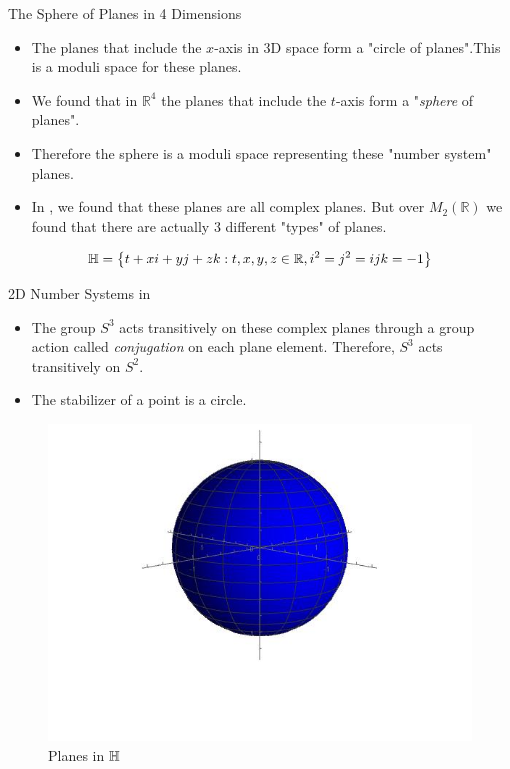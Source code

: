 \documentclass[t,slidestop,compress,mathserif,color=option,hyperref={pdfstartview={Fit},pdfpagelayout={SinglePage},pdfpagemode={UseOutlines}}]{beamer}
\begin{document}
\begin{frame}{The Sphere of Planes in 4 Dimensions}
    \begin{itemize}
        \item The planes that include the $x$-axis in 3D space form a "circle of planes".This is a moduli space for these planes.
        \item We found that in $\mathbb{R}^4$ the planes that include the $t$-axis form a "\textit{sphere} of planes".
        \item Therefore the sphere is a moduli space representing these "number system" planes.
        \item In \bH, we found that these planes are all complex planes. But over $M_2(\mathbb{R})$ we found that there are actually 3 different "types" of planes.
    \end{itemize}
    \begin{align*}
            \protect\mathbb{H} = \left\{t + xi + yj + zk : t, x, y, z \in \protect\mathbb{R}, i^2=j^2=ijk=-1 \right\}
    \end{align*}
\end{frame}
\begin{frame}{2D Number Systems in \bH}
    \begin{itemize}
        \item The group $S^3$ acts transitively on these complex planes through a group action called \textit{conjugation} on each plane element. Therefore, $S^3$ acts transitively on $S^2$. 
        \item The stabilizer of a point is a circle. 
    \end{itemize}
    
    \begin{figure}
        \centering
        \includegraphics[trim = 0 120 0 0, scale=.4]{H Pres - 8-20-20/QuatSphere.jpg}
        \caption{Planes in $\protect\mathbb{H}$}
        \label{fig:H}
    \end{figure}
\end{frame}
\end{document}
